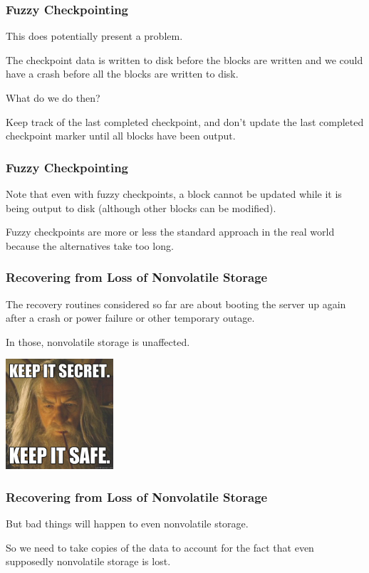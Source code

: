 \begin{frame}
\frametitle{Fuzzy Checkpointing}

This does potentially present a problem. 

The checkpoint data is written to disk before the blocks are written and we could have a crash before all the blocks are written to disk. 

What do we do then? 

Keep track of the last completed checkpoint, and don't update the last completed checkpoint marker until all blocks have been output.

\end{frame}

\begin{frame}
\frametitle{Fuzzy Checkpointing}

Note that even with fuzzy checkpoints, a block cannot be updated while it is being output to disk (although other blocks can be modified). 

Fuzzy checkpoints are more or less the standard approach in the real world because the alternatives take too long.


\end{frame}

\begin{frame}
\frametitle{Recovering from Loss of Nonvolatile Storage}

The recovery routines considered so far are about booting the server up again after a crash or power failure or other temporary outage.

In those, nonvolatile storage is unaffected. 

\begin{center}
	\includegraphics[width=0.3\textwidth]{images/secretsafe.jpg}
\end{center}


\end{frame}

\begin{frame}
\frametitle{Recovering from Loss of Nonvolatile Storage}
But bad things will happen to even nonvolatile storage. 

So we need to take copies of the data to account for the fact that even supposedly nonvolatile storage is lost.


\end{frame}


